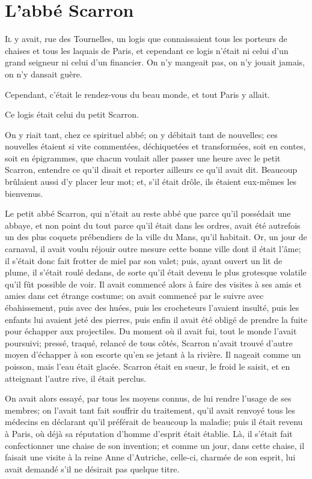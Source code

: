 \chapter{L'abbé Scarron}

\lettrine{I}{l} y avait, rue des Tournelles, un logis que connaissaient tous les porteurs de chaises et tous les laquais de Paris, et cependant ce logis n'était ni celui d'un grand seigneur ni celui d'un financier. On n'y mangeait pas, on n'y jouait jamais, on n'y dansait guère.

Cependant, c'était le rendez-vous du beau monde, et tout Paris y allait.

Ce logis était celui du petit Scarron.

On y riait tant, chez ce spirituel abbé; on y débitait tant de nouvelles; ces nouvelles étaient si vite commentées, déchiquetées et transformées, soit en contes, soit en épigrammes, que chacun voulait aller passer une heure avec le petit Scarron, entendre ce qu'il disait et reporter ailleurs ce qu'il avait dit. Beaucoup brûlaient aussi d'y placer leur mot; et, s'il était drôle, ils étaient eux-mêmes les bienvenus.

Le petit abbé Scarron, qui n'était au reste abbé que parce qu'il possédait une abbaye, et non point du tout parce qu'il était dans les ordres, avait été autrefois un des plus coquets prébendiers de la ville du Mans, qu'il habitait. Or, un jour de carnaval, il avait voulu réjouir outre mesure cette bonne ville dont il était l'âme; il s'était donc fait frotter de miel par son valet; puis, ayant ouvert un lit de plume, il s'était roulé dedans, de sorte qu'il était devenu le plus grotesque volatile qu'il fût possible de voir. Il avait commencé alors à faire des visites à ses amis et amies dans cet étrange costume; on avait commencé par le suivre avec ébahissement, puis avec des huées, puis les crocheteurs l'avaient insulté, puis les enfants lui avaient jeté des pierres, puis enfin il avait été obligé de prendre la fuite pour échapper aux projectiles. Du moment où il avait fui, tout le monde l'avait poursuivi; pressé, traqué, relancé de tous côtés, Scarron n'avait trouvé d'autre moyen d'échapper à son escorte qu'en se jetant à la rivière. Il nageait comme un poisson, mais l'eau était glacée. Scarron était en sueur, le froid le saisit, et en atteignant l'autre rive, il était perclus.

On avait alors essayé, par tous les moyens connus, de lui rendre l'usage de ses membres; on l'avait tant fait souffrir du traitement, qu'il avait renvoyé tous les médecins en déclarant qu'il préférait de beaucoup la maladie; puis il était revenu à Paris, où déjà sa réputation d'homme d'esprit était établie. Là, il s'était fait confectionner une chaise de son invention; et comme un jour, dans cette chaise, il faisait une visite à la reine Anne d'Autriche, celle-ci, charmée de son esprit, lui avait demandé s'il ne désirait pas quelque titre.

